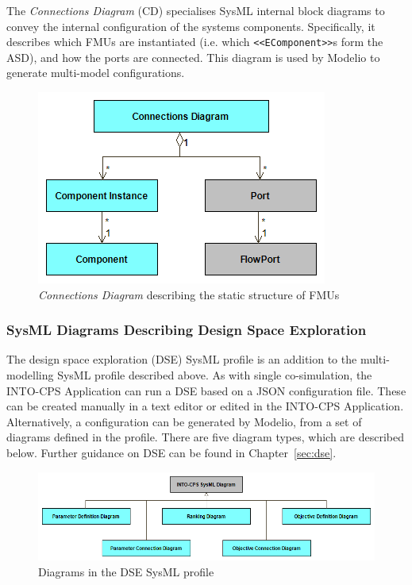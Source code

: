 The \emph{Connections Diagram} (CD) specialises SysML internal block diagrams to convey the internal configuration of the systems components. Specifically, it describes which FMUs are instantiated (i.e. which \texttt{<<EComponent>>}s form the ASD), and how the ports are connected. This diagram is used by Modelio to generate multi-model configurations.

\begin{figure}[h!]
\centering
\includegraphics[scale=0.6]{figures/Architecting/ConnectionsView}
\caption{\emph{Connections Diagram} describing the static structure of FMUs}
\label{fig:sysmlintocps:cd}
\end{figure}

\subsubsection{SysML Diagrams Describing Design Space Exploration}
\label{sec:sysml:dse}

The design space exploration (DSE) SysML profile is an addition to the multi-modelling SysML profile described above. As with single co-simulation, the INTO-CPS Application can run a DSE based on a JSON configuration file. These can be created manually in a text editor or edited in the INTO-CPS Application. Alternatively, a configuration can be generated by Modelio, from a set of diagrams defined in the profile. There are five diagram types, which are described below. Further guidance on DSE can be found in Chapter~\ref{sec:dse}.

\begin{figure}[h!]
\centering
\includegraphics[scale=0.5]{figures/DSE/DSEViews}
\caption{Diagrams in the DSE SysML profile}
\label{fig:sysml:dse}
\end{figure}


